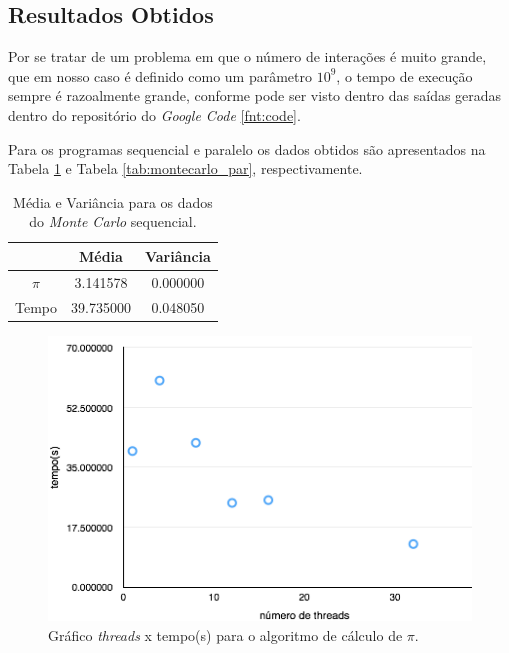 \documentclass[11pt,twoside]{article}
\begin{document}
    \subsection{Resultados Obtidos}
    
        Por se tratar de um problema em que o número de interações é muito grande, que 
        em nosso caso é definido como um parâmetro $10^9$, o tempo de execução sempre é 
        razoalmente grande, conforme pode ser visto dentro das saídas geradas dentro do
        repositório do {\it Google Code} \ref{fnt:code}.
        
        Para os programas sequencial e paralelo os dados obtidos são apresentados na Tabela 
        \ref{tab:montecarlo_seq} e Tabela \ref{tab:montecarlo_par}, respectivamente.
        
        \begin{table}[ht]
        \centering
            \begin{tabular}{|c|c|c|}
             \hline
            & Média & Variância \\ \hline
            $\pi$ & 3.141578 & 0.000000 \\ \hline
            Tempo & 39.735000 & 0.048050 \\ \hline
            \end{tabular}
        \caption{Média e Variância para os dados do {\it Monte Carlo} sequencial.}
        \label{tab:montecarlo_seq}
        \end{table}
        
        \begin{figure}[ht]
            \centering
        	\includegraphics[scale=0.8]{figures/grafico_montecarlo.png}
    		\caption{Gráfico {\it threads} x tempo(s) para o algoritmo de cálculo de $\pi$.}
    		\label{img:grafico_montecarlo}
    	\end{figure}
    	
\end{document}
